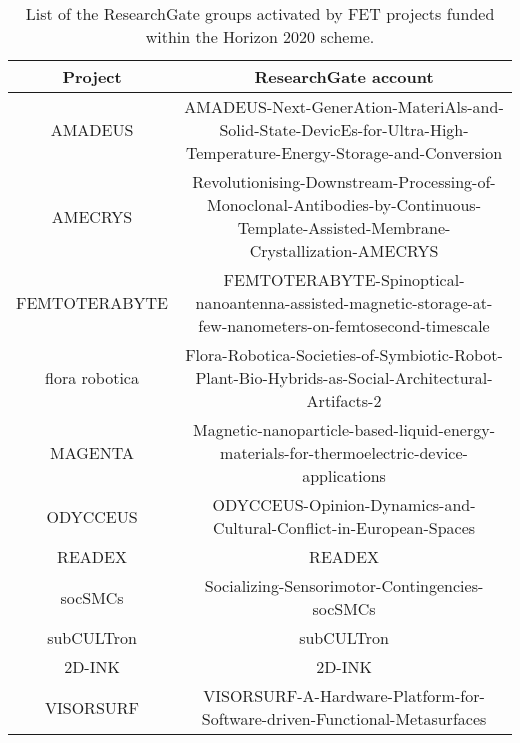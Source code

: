 \begin{table}[h]
 \begin{center}
 {\tiny
  \begin{tabular}{cc}
   \hline 
   \hline
   Project & ResearchGate account \\ 
   \hline
   \hline
   AMADEUS & AMADEUS-Next-GenerAtion-MateriAls-and-Solid-State-DevicEs-for-Ultra-High-Temperature-Energy-Storage-and-Conversion \\
   AMECRYS & Revolutionising-Downstream-Processing-of-Monoclonal-Antibodies-by-Continuous-Template-Assisted-Membrane-Crystallization-AMECRYS \\
   FEMTOTERABYTE & FEMTOTERABYTE-Spinoptical-nanoantenna-assisted-magnetic-storage-at-few-nanometers-on-femtosecond-timescale \\
   flora robotica & Flora-Robotica-Societies-of-Symbiotic-Robot-Plant-Bio-Hybrids-as-Social-Architectural-Artifacts-2 \\
   MAGENTA & Magnetic-nanoparticle-based-liquid-energy-materials-for-thermoelectric-device-applications \\
   ODYCCEUS & ODYCCEUS-Opinion-Dynamics-and-Cultural-Conflict-in-European-Spaces \\
   READEX & READEX \\
   socSMCs & Socializing-Sensorimotor-Contingencies-socSMCs \\
   subCULTron & subCULTron \\
   2D-INK & 2D-INK \\
   VISORSURF & VISORSURF-A-Hardware-Platform-for-Software-driven-Functional-Metasurfaces \\
   \hline
   \hline
  \end{tabular}
 } 
 \end{center}
 \caption{List of the ResearchGate groups activated by FET projects funded within the Horizon 2020 scheme.}
\label{ResearchGate_accounts} 
\end{table}